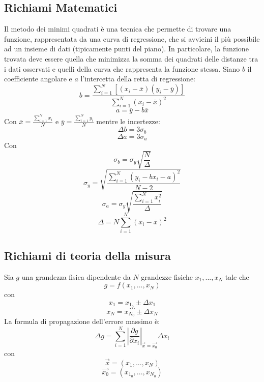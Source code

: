 \documentclass[11pt]{article}
\begin{document}
\subsection{Richiami Matematici}
Il metodo dei minimi quadrati è una tecnica che permette di trovare una funzione, rappresentata da una curva di regressione, che si avvicini il più possibile ad un insieme di dati (tipicamente punti del piano). In particolare, la funzione trovata deve essere quella che minimizza la somma dei quadrati delle distanze tra i dati osservati e quelli della curva che rappresenta la funzione stessa. Siano $b$ il coefficiente angolare e $a$ l'intercetta della retta di regressione:
\begin{equation}
    b=\frac{\displaystyle\sum_{i=1}^{N}[(x_i-\overline{x})(y_i-\overline{y})]}{\displaystyle\sum_{i=1}^{N}(x_i-\overline{x})^2}
\end{equation}
\begin{equation}
    a=\overline{y}-b\overline{x}
\end{equation}
Con $\overline{x}=\frac{\displaystyle\sum_{i=1}^{N}x_i}{N}$ e $\overline{y}=\frac{\displaystyle\sum_{i=1}^{N}y_i}{N}$
mentre le incertezze:
\begin{equation}
    \Delta b=3\sigma_b
\end{equation}
\begin{equation}
    \Delta a=3\sigma_a
\end{equation}
Con $$\sigma_b=\sigma_y\sqrt{\frac{N}{\Delta}}$$
$$\sigma_y=\sqrt{\frac{\displaystyle\sum_{i=1}^{N}(y_i-bx_i-a)^2}{N-2}}$$
$$\sigma_a=\sigma_y\sqrt{\frac{\displaystyle\sum_{i=1}^{N}x_i^2}{\Delta}}$$
$$\Delta=N\displaystyle\sum_{i=1}^{N}(x_i-\overline{x})^2$$

\subsection{Richiami di teoria della misura}
Sia $g$ una grandezza fisica dipendente da $N$ grandezze fisiche $x_1,...,x_N$ tale che
\begin{equation}
    g=f(x_1,...,x_N)
\end{equation}
con
\begin{equation}
    x_1 = x_{1_0}\pm \Delta x_1
\end{equation}
$$ ... $$
\begin{equation}
    x_N = x_{N_0}\pm \Delta x_N
\end{equation}
La formula di propagazione dell'errore massimo è:
\begin{equation}
    \Delta g=\displaystyle\sum_{i=1}^{N}\left|\frac{\partial g}{\partial x_i}\right|_{\vec{x}=\vec{x_0}}\Delta x_i
\end{equation}
con
\begin{equation}
    \vec{x}=(x_1,...,x_N)
\end{equation}
\begin{equation}
    \vec{x_0}=(x_{1_0},...,x_{N_0})
\end{equation}
\end{document}
